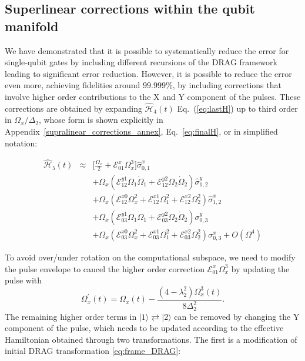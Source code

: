 \documentclass[superscriptaddress,amsmath,amssymb,aps,twocolumn,praplied,notitlepage]{revtex4-2}
\newcommand{\ket}[1]{\vert #1 \rangle}
\begin{document}
\subsection{Superlinear corrections within the qubit manifold}
\label{SupraLinear}
We have demonstrated that it is possible to systematically reduce the error for single-qubit gates by including different recursions of the DRAG framework leading to significant error reduction. However, it is possible to reduce  the error even more, achieving fidelities around $99.999\%$,  by including corrections that involve higher order contributions to the X and Y component of the pulses. These corrections are obtained by expanding $\hat{\mathcal{H}}_4(t)$ Eq.~(\ref{eq:lastH})  up to third order in $\Omega_x/ \Delta_2$, whose form is shown explicitly in Appendix~\ref{supralinear_corrections_annex},  Eq.~\ref{eq:finalH}, or in simplified notation:

\begin{eqnarray}
    \hat{\mathcal{H}}_5(t) &\approx& \bigg[\frac{\Omega_x}{2}+\mathcal{E}^x_{01}\Omega_x^3\bigg]\hat{\sigma}_{0,1}^x\\&&+\Omega_x(\mathcal{E}^{y1}_{12}\Omega_1\dot\Omega_1+\mathcal{E}^{y2}_{12}\Omega_2\dot\Omega_2)\hat{\sigma}_{1,2}^y \nonumber \\
    &&+ \Omega_x(\mathcal{E}^{x0}_{12}\Omega_x^2+\mathcal{E}^{x1}_{12}\Omega_1^2+\mathcal{E}^{x2}_{12}\Omega_2^2)\hat{\sigma}_{1,2}^x \nonumber \\
    &&+ \Omega_x(\mathcal{E}^{y1}_{03}\Omega_1\dot{\Omega}_1+ \mathcal{E}^{y2}_{03}\Omega_2\dot{\Omega}_2)\sigma_{0,3}^y \nonumber \\
    &&
    + \Omega_x(\mathcal{E}^{x0}_{03}\Omega_x^2+\mathcal{E}^{x1}_{03}\Omega_1^2+\mathcal{E}^{x2}_{03}\Omega_2^2)\sigma_{0,3}^x + O(\Omega^4)
\nonumber
\end{eqnarray}



To avoid over/under rotation on the computational subspace, we need to modify the pulse envelope to cancel the higher order correction $\mathcal{E}^x_{01}\Omega_x^3$ by updating the pulse with
\begin{equation}
    \Omega_x^{'}(t) = \Omega_x(t)-\frac{(4-\lambda_2^2)\Omega_x^3(t)}{8\Delta_2^2}.
    \label{eq:Cube}
\end{equation}
The  remaining higher order terms in $\ket{1}\rightleftarrows\ket{2}$ can be removed by changing the Y component of the pulse, which needs to be updated according to the effective Hamiltonian obtained through two transformations. The first is a modification of initial DRAG transformation \ref{eq:frame_DRAG}:
\end{document}
